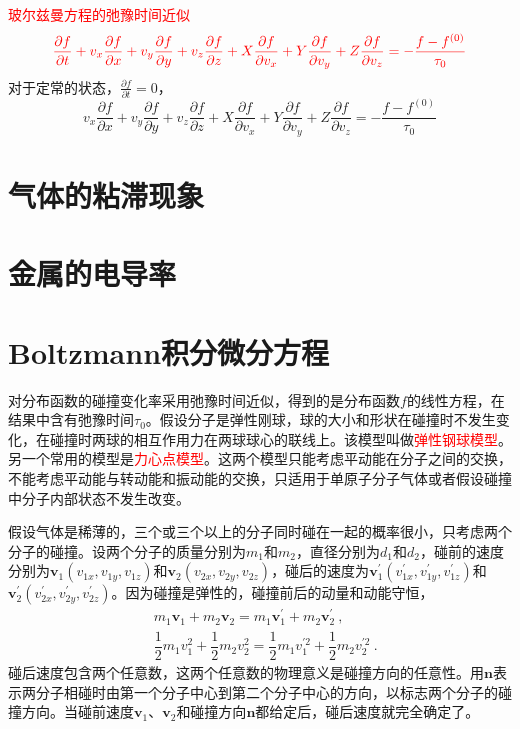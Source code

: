 \documentclass[12pt,a4paper]{article}
\renewcommand{\vec}[1]{\boldsymbol{#1}}
\begin{document}
\textcolor{red}{玻尔兹曼方程的弛豫时间近似}
\begin{equation}
\color{red} \frac{\partial f}{\partial t} + v_x\frac{\partial f}{\partial x} +v_y \frac{\partial f}{\partial y} +v_z \frac{\partial f}{\partial z} +X \frac{\partial f}{\partial v_x} +Y \frac{\partial f}{\partial v_y} +Z \frac{\partial f}{\partial v_z} = -\frac{f-f^{(0)} }{\tau_0}
\end{equation}
对于定常的状态，$\frac{\partial f}{\partial t} = 0$，
\begin{equation}
v_x\frac{\partial f}{\partial x} +v_y \frac{\partial f}{\partial y} +v_z \frac{\partial f}{\partial z} +X \frac{\partial f}{\partial v_x} +Y \frac{\partial f}{\partial v_y} +Z \frac{\partial f}{\partial v_z} = -\frac{f-f^{(0)} }{\tau_0}
\end{equation}


\section{气体的粘滞现象}
\cite{2013热力学} 






\section{金属的电导率}
\cite{2013热力学} 

\section{Boltzmann积分微分方程}
\cite{2013热力学} 对分布函数的碰撞变化率采用弛豫时间近似，得到的是分布函数$f$的线性方程，在结果中含有弛豫时间$\tau_0$。假设分子是弹性刚球，球的大小和形状在碰撞时不发生变化，在碰撞时两球的相互作用力在两球球心的联线上。该模型叫做\textcolor{red}{弹性钢球模型}。另一个常用的模型是\textcolor{red}{力心点模型}。这两个模型只能考虑平动能在分子之间的交换，不能考虑平动能与转动能和振动能的交换，只适用于单原子分子气体或者假设碰撞中分子内部状态不发生改变。

假设气体是稀薄的，三个或三个以上的分子同时碰在一起的概率很小，只考虑两个分子的碰撞。设两个分子的质量分别为$m_1$和$m_2$，直径分别为$d_1$和$d_2$，碰前的速度分别为$\vec{v}_1(v_{1x}, v_{1y}, v_{1z})$和$\vec{v}_2(v_{2x}, v_{2y}, v_{2z})$，碰后的速度为$\vec{v}^\prime_1(v^\prime_{1x}, v^\prime_{1y}, v^\prime_{1z})$和$\vec{v}^\prime_2(v^\prime_{2x}, v^\prime_{2y}, v^\prime_{2z})$。因为碰撞是弹性的，碰撞前后的动量和动能守恒，
\begin{align}
& m_1 \vec{v}_1 +m_2 \vec{v}_2 = m_1 \vec{v}^\prime_1 +m_2 \vec{v}^\prime_2 ~, \\
& \dfrac{1}{2} m_1 v_1^2 +\dfrac{1}{2} m_2 v_2^2 = \dfrac{1}{2} m_1 v_1^{\prime 2} +\dfrac{1}{2} m_2 v_2^{\prime 2} ~.
\end{align}
碰后速度包含两个任意数，这两个任意数的物理意义是碰撞方向的任意性。用$\vec{n}$表示两分子相碰时由第一个分子中心到第二个分子中心的方向，以标志两个分子的碰撞方向。当碰前速度$\vec{v}_1$、$\vec{v}_2$和碰撞方向$\vec{n}$都给定后，碰后速度就完全确定了。
\end{document}
